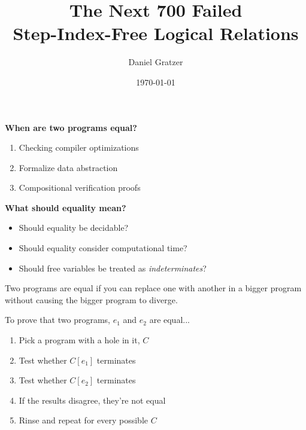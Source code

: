 \documentclass{beamer}
\title{The Next 700 Failed \\Step-Index-Free Logical Relations}
\author{Daniel Gratzer}
\date{\today}
\begin{document}
\begin{frame}
  \titlepage
\end{frame}

\begin{frame}
  \begin{center}
    \bf When are two programs \alert<5>{equal}?
  \end{center}
  \begin{enumerate}
  \item<2-> Checking compiler optimizations
  \item<3-> Formalize data abstraction
  \item<4-> Compositional verification proofs
  \end{enumerate}
\end{frame}

\begin{frame}
  \begin{center}
    \bf What should equality mean?
  \end{center}
  \pause
  \begin{itemize}
  \item Should equality be decidable?
    \pause
  \item Should equality consider computational time?
    \pause
  \item Should free variables be treated as \emph{indeterminates}?
  \end{itemize}
\end{frame}

\begin{frame}
  \begin{center}
    Two programs are equal if you can replace one with another in a
    bigger program without causing the bigger program to diverge.
  \end{center}
\end{frame}

\begin{frame}
  \centering
  To prove that two programs, $e_1$ and $e_2$ are equal...
  \begin{enumerate}
  \item Pick a program with a hole in it, $C$
  \item Test whether $C[e_1]$ terminates
  \item Test whether $C[e_2]$ terminates
  \item If the results disagree, they're not equal
    \pause
  \item Rinse and repeat for every possible $C$
  \end{enumerate}
\end{frame}
\end{document}
